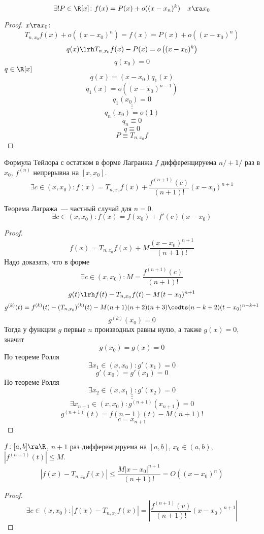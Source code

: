 \begin{conseq}
$$\exists! P \in \R[x]\colon f(x) = P(x) + o((x - x_n)^k) \quad x \ra x_0$$
\end{conseq}
\begin{proof}
$x \ra x_0$:
$$T_{n, x_0} f(x) + o\left((x-x_0)^n\right) = f(x) = P(x) + o\left((x-x_0)^n\right)$$
$$q(x) \lrh T_{n, x_0} f(x) - P(x) = o\left((x-x_0)^k\right)$$
$$q(x_0) = 0$$
$q \in \R[x]$
$$q(x) = (x - x_0) q_1(x)$$
$$q_1(x) = o\left((x - x_0)^{n-1}\right)$$
$$q_1(x_0) = 0$$
$$\vdots$$
$$q_n(x_0) = o(1)$$
$$q_n \equiv 0$$
$$q \equiv 0$$
$$P \equiv T_{n, x_0} f$$
\end{proof}

\begin{theorem}{Формула Тейлора с остатком в форме Лагранжа}
$f$ дифференцируема $n/ + 1/$ раз в $x_0$, $f^{(n)}$ непрерывна на $[x, x_0]$.
$$\exists c \in (x, x_0)\colon f(x) = T_{n, x_0} f(x) + \frac{f^{(n+1)}(c)}{(n+1)!} (x-x_0)^{n+1}$$
\end{theorem}
\begin{Rem}
Теорема Лагража~--- частный случай для $n = 0$.
$$\exists c\in(x,x_0)\colon f(x) = f(x_0) + f'(c)(x-x_0)$$
\end{Rem}
\begin{proof}
$$f(x) = T_{n, x_0} f(x) + M \frac{(x-x_0)^{n+1}}{(n+1)!}$$
Надо доказать, что в форме
$$\exists c\in(x,x_0)\colon M = \frac{f^{(n+1)}(c)}{(n+1)!}$$
$$g(t) \lrh f(t) - T_{n, x_0} f(t) - M(t-x_0)^{n+1}$$
$$g^{(k)} (t) = f^{(k)}(t) - (T_{n, x_0})^{(k)} (t) - M(n+1)(n+2)(n+3)\codts(n-k+2)(t-x_0)^{n-k+1}$$
$$g^{(k)} (x_0) = 0$$
Тогда у функции $g$ первые $n$ производных равны нулю, а также $g(x) = 0$, значит
$$g(x_0) = g(x) = 0$$
По теореме Ролля
$$\exists x_1\in(x, x_0)\colon g'(x_1) = 0$$
$$g'(x_0) = g'(x_1) = 0$$
По теореме Ролля
$$\exists x_2\in(x, x_1)\colon g'(x_2) = 0$$
$$\vdots$$
$$\exists x_{n+1}\in(x, x_0)\colon g^{(n+1)}(x_{n+1}) = 0$$
$$g^{(n+1)}(t) = f{(n-1)}(t) - M(n+1)!$$
$$c = x_{n+1}$$
\end{proof}

\begin{conseq}
$f\colon [a, b] \ra \R$, $n+1$ раз дифференцируема на $[a, b]$, $x_0 \in (a, b)$, $\left|f^{(n+1)} (t)\right| \leqslant M$.
$$\left|f(x) - T_{n, x_0} f(x)\right| \leqslant \frac{M \left|x-x_0\right|^{n+1}}{(n+1)!} = O\left((x-x_0)^n\right)$$
\end{conseq}
\begin{proof}
$$\exists c \in (x,x_0)\colon \left|f(x) - T_{n, x_0} f(x)\right| = \left|\frac{f^{(n+1)}(v)}{(n+1)!}(x-x_0)^{n+1}\right|$$
\end{proof}

